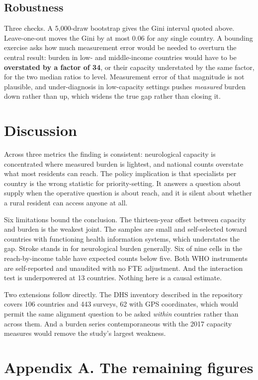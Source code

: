 \documentclass[10pt]{article}
\begin{document}
\subsection*{Robustness}

Three checks. A 5{,}000-draw bootstrap gives the Gini interval quoted above.
Leave-one-out moves the Gini by at most 0.06 for any single country. A bounding
exercise asks how much measurement error would be needed to overturn the central
result: burden in low- and middle-income countries would have to be
\textbf{overstated by a factor of 34}, or their capacity understated by the same
factor, for the two median ratios to level. Measurement error of that magnitude
is not plausible, and under-diagnosis in low-capacity settings pushes
\emph{measured} burden down rather than up, which widens the true gap rather
than closing it.

\section*{Discussion}

Across three metrics the finding is consistent: neurological capacity is
concentrated where measured burden is lightest, and national counts overstate
what most residents can reach. The policy implication is that specialists per
country is the wrong statistic for priority-setting. It answers a question about
supply when the operative question is about reach, and it is silent about
whether a rural resident can access anyone at all.

Six limitations bound the conclusion. The thirteen-year offset between capacity
and burden is the weakest joint. The samples are small and self-selected toward
countries with functioning health information systems, which understates the
gap. Stroke stands in for neurological burden generally. Six of nine cells in
the reach-by-income table have expected counts below five. Both WHO instruments
are self-reported and unaudited with no FTE adjustment. And the interaction test
is underpowered at 13 countries. Nothing here is a causal estimate.

Two extensions follow directly. The DHS inventory described in the repository
covers 106 countries and 443 surveys, 62 with GPS coordinates, which would
permit the same alignment question to be asked \emph{within} countries rather
than across them. And a burden series contemporaneous with the 2017 capacity
measures would remove the study's largest weakness.

\section*{Appendix A. The remaining figures}
\end{document}
